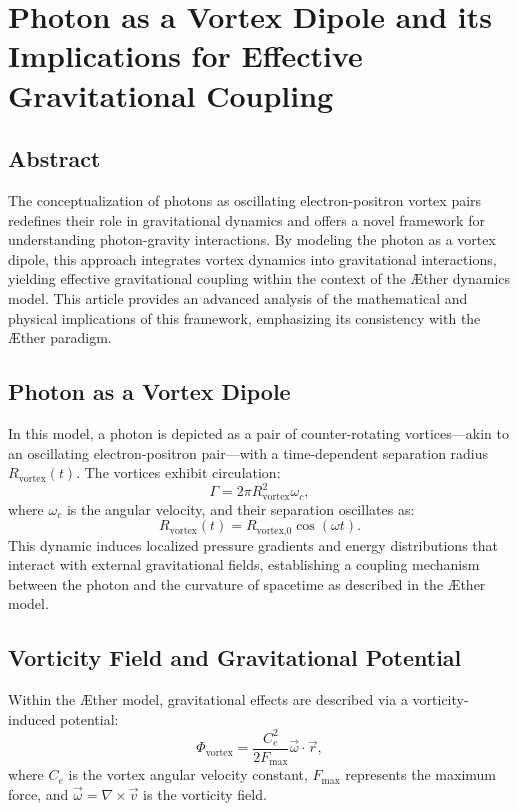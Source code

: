 

    \section{Photon as a Vortex Dipole and its Implications for Effective Gravitational Coupling}

    \subsection*{Abstract}
    The conceptualization of photons as oscillating electron-positron vortex pairs redefines their role in gravitational dynamics and offers a novel framework for understanding photon-gravity interactions. By modeling the photon as a vortex dipole, this approach integrates vortex dynamics into gravitational interactions, yielding effective gravitational coupling within the context of the Æther dynamics model. This article provides an advanced analysis of the mathematical and physical implications of this framework, emphasizing its consistency with the Æther paradigm.

    \subsection*{Photon as a Vortex Dipole}
    In this model, a photon is depicted as a pair of counter-rotating vortices—akin to an oscillating electron-positron pair—with a time-dependent separation radius $R_\text{vortex}(t)$. The vortices exhibit circulation:
    \begin{equation*}
        \Gamma = 2 \pi R_\text{vortex}^2 \omega_c,
    \end{equation*}
    where $\omega_c$ is the angular velocity, and their separation oscillates as:
    \begin{equation*}
        R_\text{vortex}(t) = R_\text{vortex,0} \cos(\omega t).
    \end{equation*}
    This dynamic induces localized pressure gradients and energy distributions that interact with external gravitational fields, establishing a coupling mechanism between the photon and the curvature of spacetime as described in the Æther model.

    \subsection*{Vorticity Field and Gravitational Potential}
    Within the Æther model, gravitational effects are described via a vorticity-induced potential:
    \begin{equation*}
        \Phi_\text{vortex} = \frac{C_e^2}{2 F_{\max}} \vec{\omega} \cdot \vec{r},
    \end{equation*}
    where $C_e$ is the vortex angular velocity constant, $F_{\max}$ represents the maximum force, and $\vec{\omega} = \nabla \times \vec{v}$ is the vorticity field.

